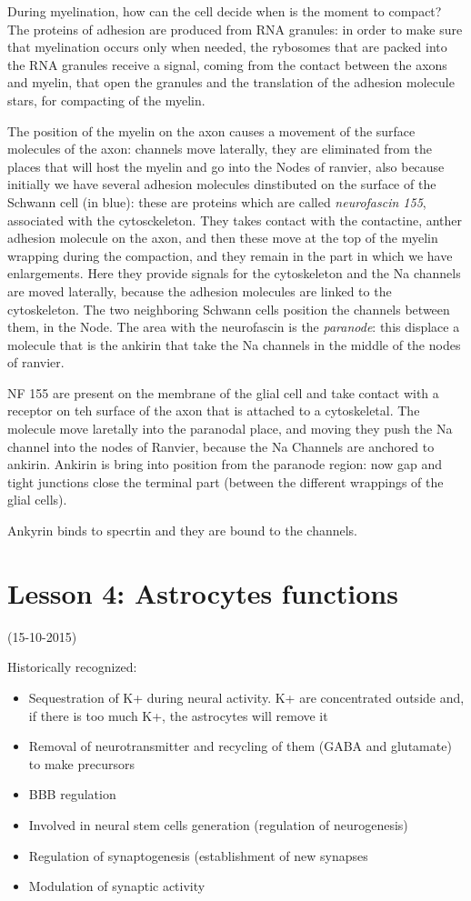 \documentclass[a4paper, 12pt]{book}
\begin{document}
During myelination, how can the cell decide when is the moment to compact? The proteins of adhesion are produced from RNA granules: in order to make sure that myelination occurs only when needed, the rybosomes that are packed into the RNA granules receive a signal, coming from the contact between the axons and myelin, that open the granules and the translation of the adhesion molecule stars, for compacting of the myelin. 

The position of the myelin on the axon causes a movement of the surface molecules of the axon: channels move laterally, they are eliminated from the places that will host the myelin and go into the Nodes of ranvier, also because initially we have several adhesion molecules dinstibuted on the surface of the Schwann cell (in blue): these are proteins which are called \emph{neurofascin 155}, associated with the cytosckeleton. They takes contact with the contactine, anther adhesion molecule on the axon, and then these move at the top of the myelin wrapping during the compaction, and they remain in the part in which we have enlargements. Here they provide signals for the cytoskeleton and the Na channels are moved laterally, because the adhesion molecules are linked to the cytoskeleton. The two neighboring Schwann cells position the channels between them, in the Node. The area with the neurofascin is the \emph{paranode}: this displace a molecule that is the ankirin that take the Na channels in the middle of the nodes of ranvier.

NF 155 are present on the membrane of the glial cell and take contact with a receptor on teh surface of the axon that is attached to a cytoskeletal. The molecule move laretally into the paranodal place, and moving they push the Na channel into the nodes of Ranvier, because the Na Channels are anchored to ankirin. Ankirin is bring into position from the paranode region: now gap and tight junctions close the terminal part (between the different wrappings of the glial cells).

Ankyrin binds to specrtin and they are bound to the channels.


\chapter{Lesson 4: Astrocytes functions}
(15-10-2015)

Historically recognized:
\begin{itemize}
\item{Sequestration of K+ during neural activity. K+ are concentrated outside and, if there is too much K+, the astrocytes will remove it}
\item{Removal of neurotransmitter and recycling of them (GABA and glutamate) to make precursors}
\item{BBB regulation}
\item{Involved in neural stem cells generation (regulation of neurogenesis)}
\item{Regulation of synaptogenesis (establishment of new synapses}
\item{Modulation of synaptic activity}
\end{itemize}
\end{document}
